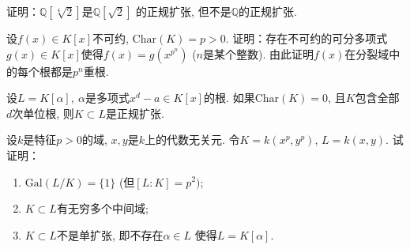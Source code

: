 \begin{problem}
    证明：$\mathbb{Q}[\sqrt[4]{2}]$是$\mathbb{Q}[\sqrt{2}]$
的正规扩张, 但不是$\mathbb{Q}$的正规扩张.
\end{problem}

\begin{solution}
    
\end{solution}

\begin{problem}
    设$f(x) \in K[x]$不可约, $\mathrm{Char}(K) = p > 0$.
证明：存在不可约的可分多项式$g(x) \in K[x]$使得$f(x) = g(x^{p^n})$
($n$是某个整数). 由此证明$f(x)$在分裂域中的每个根都是$p^n$重根.
\end{problem}

\begin{solution}
    
\end{solution}

\begin{problem}
    设$L = K[\alpha],~\alpha$是多项式$x^d - a \in K[x]$的根.
如果$\mathrm{Char}(K) = 0$,
且$K$包含全部$d$次单位根, 则$K \subset L$是正规扩张.
\end{problem}

\begin{solution}
    
\end{solution}

\begin{problem}
    设$k$是特征$p > 0$的域, $x, y$是$k$上的代数无关元.
令$K = k(x^p, y^p)$, $L = k(x, y)$. 试证明：
\begin{enumerate}[(1)]
    \item $\mathrm{Gal}(L/K) = \{1\}$ (但$[L:K] = p^2)$;
    \item $K \subset L$有无穷多个中间域;
    \item $K \subset L$不是单扩张, 即不存在$\alpha \in L$
使得$L = K[\alpha]$.
\end{enumerate}
\end{problem}

\begin{solution}
    
\end{solution}